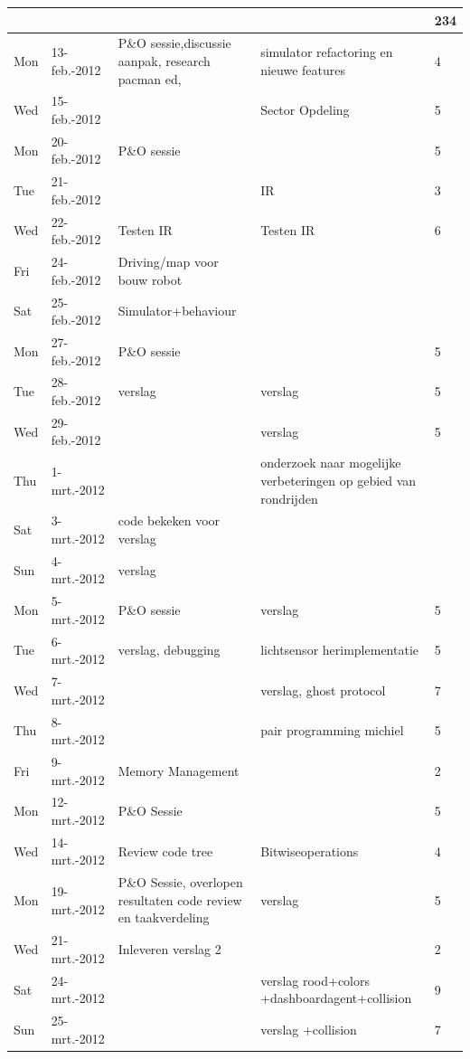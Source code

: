 \documentclass[12pt,a4paper]{report}
\begin{document}
\begin{landscape}
\begin{longtable}{llp{7cm}p{10cm}l}
\hline
 &  &  &  & 234 \\ 
\hline
Mon & 13-feb.-2012 & P\&O sessie,discussie aanpak, research pacman ed,  & simulator refactoring en nieuwe features & 4 \\ 
\hline
Wed & 15-feb.-2012 &  & Sector Opdeling & 5 \\ 
\hline
Mon & 20-feb.-2012 & P\&O sessie &  & 5 \\ 
\hline
Tue & 21-feb.-2012 &  & IR & 3 \\ 
\hline
Wed & 22-feb.-2012 & Testen IR & Testen IR & 6 \\ 
\hline
Fri & 24-feb.-2012 & Driving/map voor bouw robot &  &  \\ 
\hline
Sat & 25-feb.-2012 & Simulator+behaviour &  &  \\ 
\hline
Mon & 27-feb.-2012 & P\&O sessie &  & 5 \\ 
\hline
Tue & 28-feb.-2012 & verslag & verslag & 5 \\ 
\hline
Wed & 29-feb.-2012 &  & verslag & 5 \\ 
\hline
Thu & 1-mrt.-2012 &  & onderzoek naar mogelijke verbeteringen op gebied van rondrijden &  \\ 
\hline
Sat & 3-mrt.-2012 & code bekeken voor verslag &  &  \\ 
\hline
Sun & 4-mrt.-2012 & verslag &  &  \\ 
\hline
Mon & 5-mrt.-2012 & P\&O sessie & verslag & 5 \\ 
\hline
Tue & 6-mrt.-2012 & verslag, debugging & lichtsensor herimplementatie & 5 \\ 
\hline
Wed & 7-mrt.-2012 &  & verslag, ghost protocol & 7 \\ 
\hline
Thu & 8-mrt.-2012 &  & pair programming michiel & 5 \\ 
\hline
Fri & 9-mrt.-2012 & Memory Management &  & 2 \\ 
\hline
Mon & 12-mrt.-2012 & P\&O Sessie &  & 5 \\ 
\hline
Wed & 14-mrt.-2012 & Review code tree  & Bitwiseoperations & 4 \\ 
\hline
Mon & 19-mrt.-2012 & P\&O Sessie, overlopen resultaten code review en taakverdeling & verslag  & 5 \\ 
\hline
Wed & 21-mrt.-2012 & Inleveren verslag 2 &  & 2 \\ 
\hline
Sat & 24-mrt.-2012 &  & verslag rood+colors +dashboardagent+collision & 9 \\ 
\hline
Sun & 25-mrt.-2012 &  & verslag +collision & 7 \\ 

\end{longtable}
\end{landscape}
\end{document}
